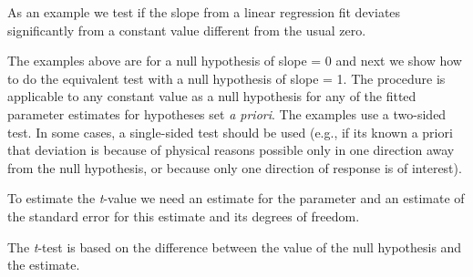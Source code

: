 \documentclass[krantz2]{krantz}\usepackage{knitr}
\begin{document}
\begin{explainbox}
As an example we test if the slope from a linear regression fit deviates significantly from a constant value different from the usual zero.

The examples above are for a null hypothesis of slope = 0 and next we show how to do the equivalent test with a null hypothesis of slope = 1. The procedure is applicable to any constant value as a null hypothesis for any of the fitted parameter estimates for hypotheses set \emph{a priori}. The examples use a two-sided test. In some cases, a single-sided test should be used (e.g., if its known a priori that deviation is because of physical reasons possible only in one direction away from the null hypothesis, or because only one direction of response is of interest).

To estimate the \emph{t}-value we need an estimate for the parameter and an estimate of the standard error for this estimate and its degrees of freedom.

\begin{knitrout}\footnotesize
{}\color{fgcolor}\begin{kframe}
\begin{alltt}
 \hlkwb{<-} \hlopt{$}\hlstd{coef[}\hlstd{,} \hlstd{]}
 \hlkwb{<-} \hlopt{$}\hlstd{coef[}\hlstd{,} \hlstd{]}
 \hlkwb{<-} \hlopt{$}\hlstd{df[}\hlstd{]}
\end{alltt}
\end{kframe}
\end{knitrout}

The \emph{t}-test is based on the difference between the value of the null hypothesis and the estimate.

\begin{knitrout}\footnotesize
{}\color{fgcolor}\begin{kframe}
\begin{alltt}
 \hlkwb{<-} 
 \hlkwb{<-}  \hlopt{-}  \hlopt{/} 
 \hlkwb{<-}   
\end{alltt}
\end{kframe}
\end{knitrout}
\end{explainbox}
\end{document}
